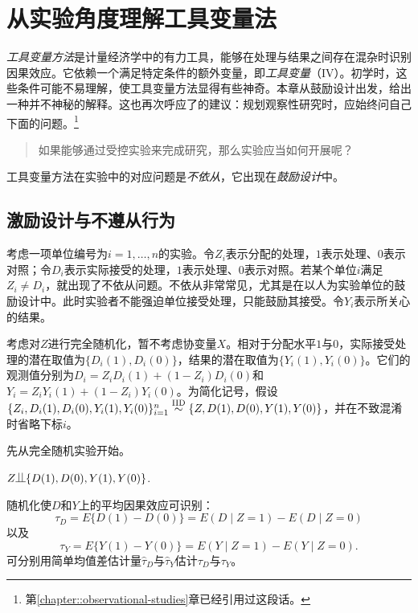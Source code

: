  
\chapter{从实验角度理解工具变量法}
 \label{chapter::iv-experiment}



{\it 工具变量方法}是计量经济学中的有力工具，能够在处理与结果之间存在混杂时识别因果效应。它依赖一个满足特定条件的额外变量，即{\it 工具变量}（IV）。初学时，这些条件可能不易理解，使工具变量方法显得有些神奇。本章从鼓励设计出发，给出一种并不神秘的解释。这也再次呼应了\citet{dorn1953philosophy}的建议：规划观察性研究时，应始终问自己下面的问题。\footnote{第\ref{chapter::observational-studies}章已经引用过这段话。}
\begin{quote}
如果能够通过受控实验来完成研究，那么实验应当如何开展呢？
\end{quote} 
工具变量方法在实验中的对应问题是{\it 不依从}，它出现在{\it 鼓励设计}中\citep{zelen1979new, powers1984effects, holland1986statistics}。 



\section{激励设计与不遵从行为}

考虑一项单位编号为$i = 1,\ldots, n$的实验。令$Z_i$表示分配的处理，$1$表示处理、$0$表示对照；令$D_i$表示实际接受的处理，$1$表示处理、$0$表示对照。若某个单位$i$满足$Z_i \neq D_i$，就出现了不依从问题。不依从非常常见，尤其是在以人为实验单位的鼓励设计中。此时实验者不能强迫单位接受处理，只能鼓励其接受。令$Y_i$表示所关心的结果。 

考虑对$Z$进行完全随机化，暂不考虑协变量$X$。相对于分配水平$1$与$0$，实际接受处理的潜在取值为$\{  D_i(1), D_i(0) \}$，结果的潜在取值为$\{ Y_i(1), Y_i(0)  \}$。它们的观测值分别为$D_i = Z_i D_i(1) + (1-Z_i) D_i(0)$和$Y_i = Z_i Y_i(1) + (1-Z_i) Y_i(0)$。为简化记号，假设$\{  Z_i, D_i(1), D_i(0) ,Y_i(1), Y_i(0)  \}_{i=1}^n \stackrel{\textup{IID}}{\sim} \{  Z, D(1), D(0) ,Y(1), Y(0)  \}$，并在不致混淆时省略下标$i$。 


先从完全随机实验开始。 
\begin{assumption}[随机化]
\label{assume::random}
$Z\ind \{D(1), D(0) ,Y(1), Y(0)   \}$. 
\end{assumption}

随机化使$D$和$Y$上的平均因果效应可识别：
$$
\tau_D = E\{  D(1) - D(0) \} = E(D\mid Z=1) - E(D \mid Z=0)
$$
以及
$$
\tau_Y = E\{  Y(1) - Y(0) \} = E(Y\mid Z=1) - E(Y\mid Z=0).  
$$
可分别用简单均值差估计量$\hat{\tau}_D$与$\hat{\tau}_Y$估计$\tau_D$与$\tau_Y$。 


